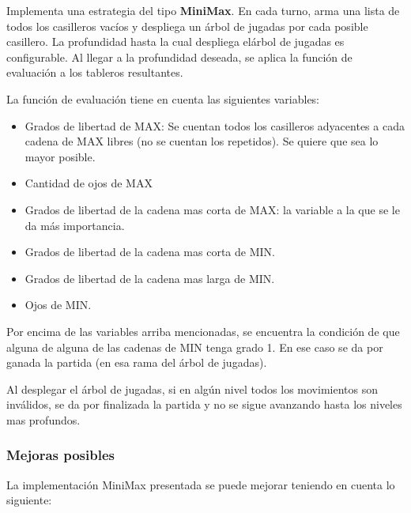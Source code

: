 \documentclass[11pt]{article}
\begin{document}
   Implementa una estrategia del tipo {\bf MiniMax}. En cada turno,
   arma una lista de todos los casilleros vac\'ios y despliega un
   \'arbol de jugadas por cada posible casillero. La profundidad hasta
   la cual despliega el\'arbol de jugadas es configurable. Al llegar a
   la profundidad deseada, se aplica la funci\'on de evaluaci\'on a
   los tableros resultantes.
   
   La funci\'on de evaluaci\'on tiene en cuenta las siguientes
   variables:
   
   \begin{itemize}
      \item Grados de libertad de MAX: Se cuentan todos los casilleros
        adyacentes a cada cadena de MAX libres (no se cuentan los
        repetidos). Se quiere que sea lo mayor posible.
      \item Cantidad de ojos de MAX
      \item Grados de libertad de la cadena mas corta de MAX: la
        variable a la que se le da m\'as importancia.
      \item Grados de libertad de la cadena mas corta de MIN.
      \item Grados de libertad de la cadena mas larga de MIN.
      \item Ojos de MIN.
   \end{itemize}
   
   Por encima de las variables arriba mencionadas, se encuentra la
   condici\'on de que alguna de alguna de las cadenas de MIN tenga
   grado 1. En ese caso se da por ganada la partida (en esa rama del
   \'arbol de jugadas).

   Al desplegar el \'arbol de jugadas, si en alg\'un nivel todos los
   movimientos son inv\'alidos, se da por finalizada la partida y no
   se sigue avanzando hasta los niveles mas profundos.

\subsubsection{Mejoras posibles}

   La implementaci\'on MiniMax presentada se puede mejorar teniendo en
   cuenta lo siguiente:
\end{document}
